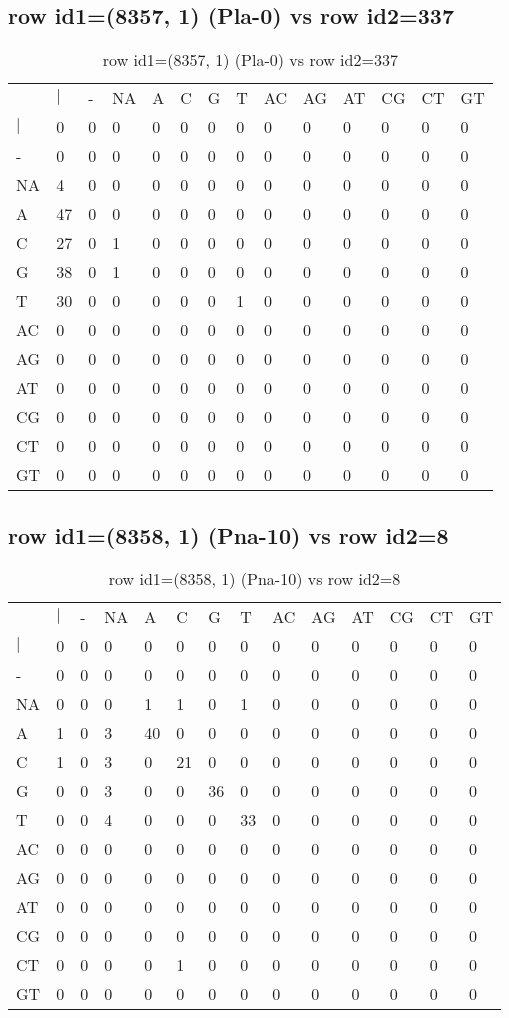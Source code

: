 \subsection{row id1=(8357, 1) (Pla-0) vs row id2=337}
\begin{center}
\begin{longtable}{|l|l|l|l|l|l|l|l|l|l|l|l|l|l|}
\caption{row id1=(8357, 1) (Pla-0) vs row id2=337} \label{table_dm574}\\
\hline
\\
\hline
&$|$&-&NA&A&C&G&T&AC&AG&AT&CG&CT&GT\\
$|$&0&0&0&0&0&0&0&0&0&0&0&0&0\\
-&0&0&0&0&0&0&0&0&0&0&0&0&0\\
NA&4&0&0&0&0&0&0&0&0&0&0&0&0\\
A&47&0&0&0&0&0&0&0&0&0&0&0&0\\
C&27&0&1&0&0&0&0&0&0&0&0&0&0\\
G&38&0&1&0&0&0&0&0&0&0&0&0&0\\
T&30&0&0&0&0&0&1&0&0&0&0&0&0\\
AC&0&0&0&0&0&0&0&0&0&0&0&0&0\\
AG&0&0&0&0&0&0&0&0&0&0&0&0&0\\
AT&0&0&0&0&0&0&0&0&0&0&0&0&0\\
CG&0&0&0&0&0&0&0&0&0&0&0&0&0\\
CT&0&0&0&0&0&0&0&0&0&0&0&0&0\\
GT&0&0&0&0&0&0&0&0&0&0&0&0&0\\
\hline
\end{longtable}
\end{center}

\subsection{row id1=(8358, 1) (Pna-10) vs row id2=8}
\begin{center}
\begin{longtable}{|l|l|l|l|l|l|l|l|l|l|l|l|l|l|}
\caption{row id1=(8358, 1) (Pna-10) vs row id2=8} \label{table_dm576}\\
\hline
\\
\hline
&$|$&-&NA&A&C&G&T&AC&AG&AT&CG&CT&GT\\
$|$&0&0&0&0&0&0&0&0&0&0&0&0&0\\
-&0&0&0&0&0&0&0&0&0&0&0&0&0\\
NA&0&0&0&1&1&0&1&0&0&0&0&0&0\\
A&1&0&3&40&0&0&0&0&0&0&0&0&0\\
C&1&0&3&0&21&0&0&0&0&0&0&0&0\\
G&0&0&3&0&0&36&0&0&0&0&0&0&0\\
T&0&0&4&0&0&0&33&0&0&0&0&0&0\\
AC&0&0&0&0&0&0&0&0&0&0&0&0&0\\
AG&0&0&0&0&0&0&0&0&0&0&0&0&0\\
AT&0&0&0&0&0&0&0&0&0&0&0&0&0\\
CG&0&0&0&0&0&0&0&0&0&0&0&0&0\\
CT&0&0&0&0&1&0&0&0&0&0&0&0&0\\
GT&0&0&0&0&0&0&0&0&0&0&0&0&0\\
\hline
\end{longtable}
\end{center}

